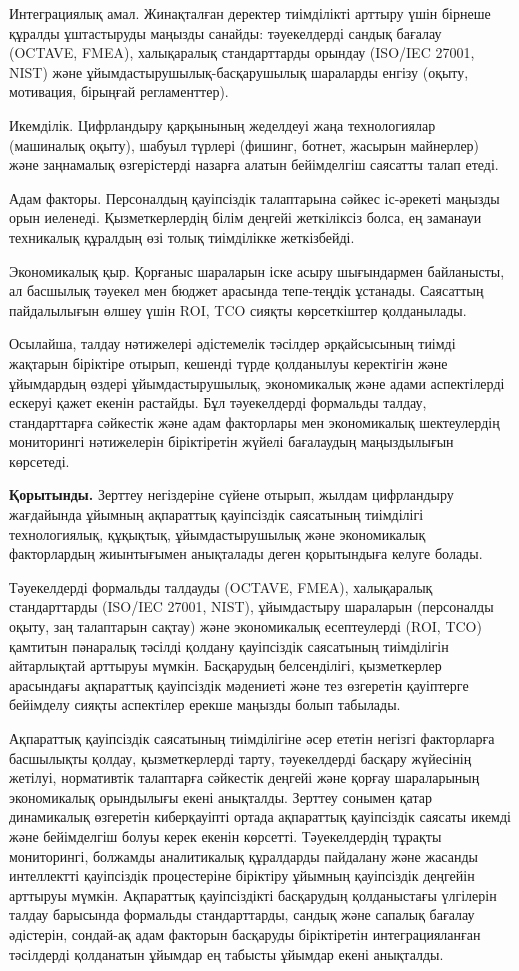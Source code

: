 Интеграциялық амал. Жинақталған деректер тиімділікті арттыру үшін
бірнеше құралды ұштастыруды маңызды санайды: тәуекелдерді сандық бағалау
(OCTAVE, FMEA), халықаралық стандарттарды орындау (ISO/IEC 27001, NIST)
және ұйымдастырушылық-басқарушылық шараларды енгізу (оқыту, мотивация,
бірыңғай регламенттер).

Икемділік. Цифрландыру қарқынының жеделдеуі жаңа технологиялар
(машиналық оқыту), шабуыл түрлері (фишинг, ботнет, жасырын майнерлер)
және заңнамалық өзгерістерді назарға алатын бейімделгіш саясатты талап
етеді.

Адам факторы. Персоналдың қауіпсіздік талаптарына сәйкес іс-әрекеті
маңызды орын иеленеді. Қызметкерлердің білім деңгейі жеткіліксіз болса,
ең заманауи техникалық құралдың өзі толық тиімділікке жеткізбейді.

Экономикалық қыр. Қорғаныс шараларын іске асыру шығындармен байланысты,
ал басшылық тәуекел мен бюджет арасында тепе-теңдік ұстанады. Саясаттың
пайдалылығын өлшеу үшін ROI, TCO сияқты көрсеткіштер қолданылады.

Осылайша, талдау нәтижелері әдістемелік тәсілдер әрқайсысының тиімді
жақтарын біріктіре отырып, кешенді түрде қолданылуы керектігін және
ұйымдардың өздері ұйымдастырушылық, экономикалық және адами аспектілерді
ескеруі қажет екенін растайды. Бұл тәуекелдерді формальды талдау,
стандарттарға сәйкестік және адам факторлары мен экономикалық
шектеулердің мониторингі нәтижелерін біріктіретін жүйелі бағалаудың
маңыздылығын көрсетеді.

{\bfseries Қорытынды.} Зерттеу негіздеріне сүйене отырып, жылдам
цифрландыру жағдайында ұйымның ақпараттық қауіпсіздік саясатының
тиімділігі технологиялық, құқықтық, ұйымдастырушылық және экономикалық
факторлардың жиынтығымен анықталады деген қорытындыға келуге болады.

Тәуекелдерді формальды талдауды (OCTAVE, FMEA), халықаралық
стандарттарды (ISO/IEC 27001, NIST), ұйымдастыру шараларын (персоналды
оқыту, заң талаптарын сақтау) және экономикалық есептеулерді (ROI, TCO)
қамтитын пәнаралық тәсілді қолдану қауіпсіздік саясатының тиімділігін
айтарлықтай арттыруы мүмкін. Басқарудың белсенділігі, қызметкерлер
арасындағы ақпараттық қауіпсіздік мәдениеті және тез өзгеретін
қауіптерге бейімделу сияқты аспектілер ерекше маңызды болып табылады.

Ақпараттық қауіпсіздік саясатының тиімділігіне әсер ететін негізгі
факторларға басшылықты қолдау, қызметкерлерді тарту, тәуекелдерді
басқару жүйесінің жетілуі, нормативтік талаптарға сәйкестік деңгейі және
қорғау шараларының экономикалық орындылығы екені анықталды. Зерттеу
сонымен қатар динамикалық өзгеретін киберқауіпті ортада ақпараттық
қауіпсіздік саясаты икемді және бейімделгіш болуы керек екенін көрсетті.
Тәуекелдердің тұрақты мониторингі, болжамды аналитикалық құралдарды
пайдалану және жасанды интеллектті қауіпсіздік процестеріне біріктіру
ұйымның қауіпсіздік деңгейін арттыруы мүмкін. Ақпараттық қауіпсіздікті
басқарудың қолданыстағы үлгілерін талдау барысында формальды
стандарттарды, сандық және сапалық бағалау әдістерін, сондай-ақ адам
факторын басқаруды біріктіретін интеграцияланған тәсілдерді қолданатын
ұйымдар ең табысты ұйымдар екені анықталды.

